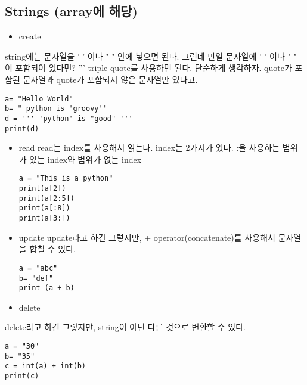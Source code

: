 \documentclass[11pt]{article}
\begin{document}
\subsection{Strings (array에 해당)}
\label{sec:orgf1edc7b}
\begin{itemize}
\item create
\end{itemize}
string에는 문자열을 ' ' 이나 " " 안에 넣으면 된다. 그런데 만일 문자열에 ' ' 이나 " " 이 포함되어 있다면?
''' triple quote를 사용하면 된다. 단순하게 생각하자. quote가 포함된 문자열과 quote가 포함되지 않은 문자열만 있다고.

\begin{verbatim}
a= "Hello World"
b= " python is 'groovy'"
d = ''' 'python' is "good" '''
print(d)
\end{verbatim}

\begin{itemize}
\item read
read는 index를 사용해서 읽는다. index는 2가지가 있다. :을 사용하는 범위가 있는 index와 범위가 없는 index
\begin{verbatim}
a = "This is a python"
print(a[2])
print(a[2:5])
print(a[:8])
print(a[3:])
\end{verbatim}

\item update
update라고 하긴 그렇지만, + operator(concatenate)를 사용해서 문자열을 합칠 수 있다.
\begin{verbatim}
a = "abc"
b= "def"
print (a + b)
\end{verbatim}

\item delete
\end{itemize}
delete라고 하긴 그렇지만, string이 아닌 다른 것으로 변환할 수 있다.
\begin{verbatim}
a = "30"
b= "35"
c = int(a) + int(b)
print(c)
\end{verbatim}
\end{document}
